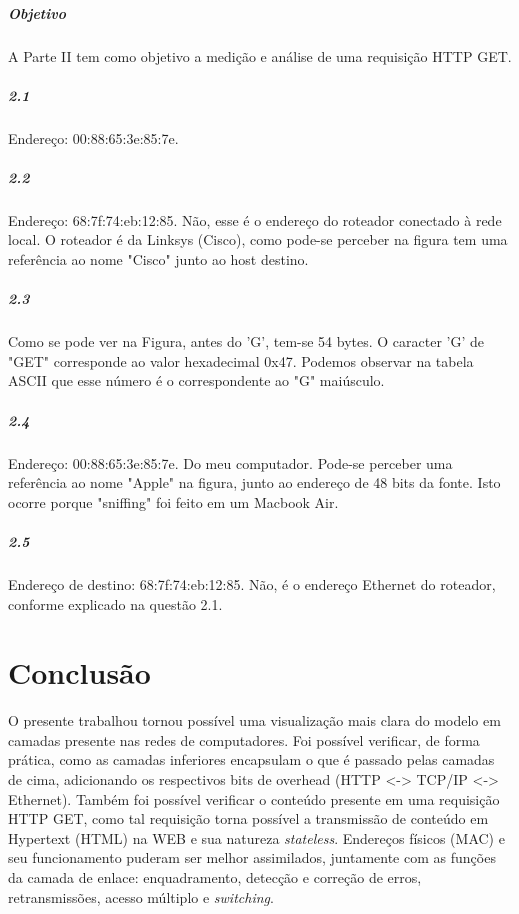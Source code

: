 \documentclass[12pt,a4paper]{report}
\begin{document}
\paragraph{Objetivo} A Parte II tem como objetivo a medição e análise de uma requisição HTTP GET.

\paragraph{2.1} Endereço: 00:88:65:3e:85:7e.

\paragraph{2.2} Endereço: 68:7f:74:eb:12:85. Não, esse é o endereço do roteador conectado à rede local. O roteador é da Linksys (Cisco), como pode-se perceber na figura tem uma referência ao nome "Cisco" junto ao host destino.

\paragraph{2.3} Como se pode ver na Figura, antes do 'G', tem-se 54 bytes. O caracter 'G' de "GET" corresponde ao valor hexadecimal 0x47. Podemos observar na tabela ASCII que esse número é o correspondente ao "G" maiúsculo.

\paragraph{2.4} Endereço: 00:88:65:3e:85:7e. Do meu computador. Pode-se perceber uma referência ao nome "Apple" na figura, junto ao endereço de 48 bits da fonte. Isto ocorre porque "sniffing" foi feito em um Macbook Air.

\paragraph{2.5} Endereço de destino: 68:7f:74:eb:12:85. Não, é o endereço Ethernet do roteador, conforme explicado na questão 2.1.

\chapter{Conclusão} O presente trabalhou tornou possível uma visualização mais clara do modelo em camadas presente nas redes de computadores. Foi possível verificar, de forma prática, como as camadas inferiores encapsulam o que é passado pelas camadas de cima, adicionando os respectivos bits de overhead (HTTP <-> TCP/IP <-> Ethernet). Também foi possível verificar o conteúdo presente em uma requisição HTTP GET, como tal requisição torna possível a transmissão de conteúdo em Hypertext (HTML) na WEB e sua natureza \textit{stateless}. Endereços físicos (MAC) e seu funcionamento puderam ser melhor assimilados, juntamente com as funções da camada de enlace: enquadramento, detecção e correção de erros, retransmissões, acesso múltiplo e \textit{switching}.
\end{document}
